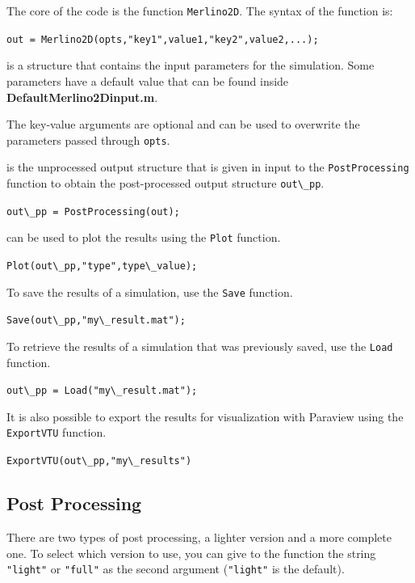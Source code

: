 \documentclass[12pt,a4paper]{article}
\newcommand{\matlabs}[1]{{\lstinline[style=MatlabStyle]!#1!}}
\begin{document}
\vspace{10pt}

\noindent The core of the code is the function \matlabs{Merlino2D}.
The syntax of the function is:

\matlabs{out = Merlino2D(opts,"key1",value1,"key2",value2,...);}

\noindent \matlabs{opts} is a structure that contains the input parameters for the simulation. 
Some parameters have a default value that can be found inside \textbf{DefaultMerlino2Dinput.m}.

\noindent The key-value arguments are optional and can be used to overwrite the parameters passed through \matlabs{opts}. 

\vspace{10pt}
\noindent \matlabs{out} is the unprocessed output structure that is given in input to the \matlabs{PostProcessing} function to obtain the post-processed output structure \matlabs{out\_pp}.

\matlabs{out\_pp = PostProcessing(out);}

\vspace{10pt}
\noindent \matlabs{out\_pp} can be used to plot the results using the \matlabs{Plot} function. 

\matlabs{Plot(out\_pp,"type",type\_value);}


\vspace{10pt}
\noindent To save the results of a simulation, use the \matlabs{Save} function.

\matlabs{Save(out\_pp,"my\_result.mat");}


\vspace{10pt}
\noindent To retrieve the results of a simulation that was previously saved, use the \matlabs{Load} function.

\matlabs{out\_pp = Load("my\_result.mat");}


\vspace{10pt}
\noindent It is also possible to export the results for visualization with Paraview using the \matlabs{ExportVTU} function. 

\matlabs{ExportVTU(out\_pp,"my\_results")}

\subsection{Post Processing}
There are two types of post processing, a lighter version and a more complete one.
To select which version to use, you can give to the function the string \matlabs{"light"} or \matlabs{"full"} as the second argument (\matlabs{"light"} is the default).
\end{document}
